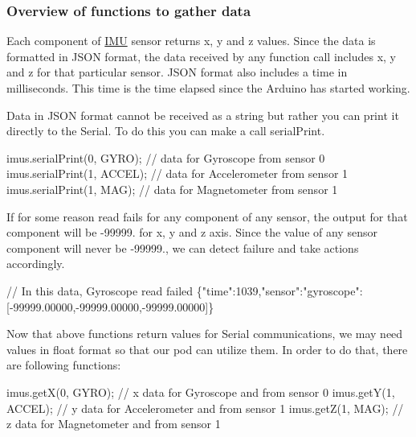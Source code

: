 \subsubsection*{Overview of functions to gather data}

Each component of \hyperlink{class_i_m_u}{I\+MU} sensor returns x, y and z values. Since the data is formatted in J\+S\+ON format, the data received by any function call includes x, y and z for that particular sensor. J\+S\+ON format also includes a time in milliseconds. This time is the time elapsed since the Arduino has started working.

Data in J\+S\+ON format cannot be received as a string but rather you can print it directly to the Serial. To do this you can make a call {\ttfamily serial\+Print}.


\begin{DoxyCode}
imus.serialPrint(0, GYRO);        \textcolor{comment}{// data for Gyroscope from sensor 0}
imus.serialPrint(1, ACCEL);    \textcolor{comment}{// data for Accelerometer from sensor 1}
imus.serialPrint(1, MAG);         \textcolor{comment}{// data for Magnetometer from sensor 1}
\end{DoxyCode}


If for some reason read fails for any component of any sensor, the output for that component will be {\ttfamily -\/99999.} for x, y and z axis. Since the value of any sensor component will never be {\ttfamily -\/99999.}, we can detect failure and take actions accordingly.


\begin{DoxyCode}
\textcolor{comment}{// In this data, Gyroscope read failed}
\{\textcolor{stringliteral}{"time"}:1039,\textcolor{stringliteral}{"sensor"}:\textcolor{stringliteral}{"gyroscope"}:[-99999.00000,-99999.00000,-99999.00000]\}
\end{DoxyCode}


Now that above functions return values for Serial communications, we may need values in float format so that our pod can utilize them. In order to do that, there are following functions\+:


\begin{DoxyCode}
imus.getX(0, GYRO);                 \textcolor{comment}{// x data for Gyroscope and from sensor 0}
imus.getY(1, ACCEL);                \textcolor{comment}{// y data for Accelerometer and from sensor 1}
imus.getZ(1, MAG);                  \textcolor{comment}{// z data for Magnetometer and from sensor 1}
\end{DoxyCode}


